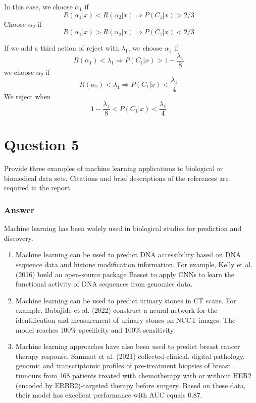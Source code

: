 \documentclass{article}
\begin{document}
\noindent In this case, we choose $\alpha_1$ if $$R(\alpha_1|x) < R(\alpha_2|x) \Rightarrow P(C_1|x)>2/3$$
Choose $\alpha_2$ if $$R(\alpha_1|x) > R(\alpha_2|x) \Rightarrow P(C_1|x)<2/3$$


\noindent If we add a third action of reject with $\lambda_1$, we choose $\alpha_1$ if $$R(\alpha_1) < \lambda_1 \Rightarrow P(C_1|x)>1-\frac{\lambda_1}{8}$$
we choose $\alpha_2$ if $$R(\alpha_2) < \lambda_1 \Rightarrow P(C_1|x)<\frac{\lambda_1}{4}$$
We reject when $$1-\frac{\lambda_1}{8}<P(C_1|x)<\frac{\lambda_1}{4}$$

\section*{Question 5}
Provide three examples of machine learning applications to biological or biomedical data sets. Citations and brief descriptions of the references are required in the report. 

\subsubsection*{Answer}
Machine learning has been widely used in biological studies for prediction and discovery.

\begin{enumerate}
    \item Machine learning can be used to predict DNA accessibility based on DNA sequence data and histone modification information. For example, Kelly et al. (2016) build an open-source package Basset to apply CNNs to learn the functional activity of DNA sequences from genomics data. 
    \item Machine learning can be used to predict urinary stones in CT scans. For example, Babajide et al. (2022) construct a neural network for the identification and measurement of urinary stones on NCCT images. The model reaches 100\% specificity and 100\% sensitivity.
    \item Machine learning approaches have also been used to predict breast cancer therapy response. Sammut et al. (2021) collected clinical, digital pathology, genomic and transcriptomic profiles of pre-treatment biopsies of breast tumours from 168 patients treated with chemotherapy with or without HER2 (encoded by ERBB2)-targeted therapy before surgery. Based on these data, their model has excellent performance with AUC equals 0.87.
\end{enumerate}
\end{document}
